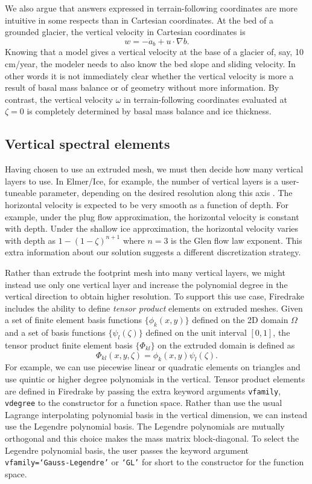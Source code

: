 \documentclass{article}
\theoremstyle{definition}
\theoremstyle{plain}
\begin{document}
We also argue that answers expressed in terrain-following coordinates are more intuitive in some respects than in Cartesian coordinates.
At the bed of a grounded glacier, the vertical velocity in Cartesian coordinates is
\begin{equation}
    w = -\dot a_b + u\cdot\nabla b.
\end{equation}
Knowing that a model gives a vertical velocity at the base of a glacier of, say, 10 cm/year, the modeler needs to also know the bed slope and sliding velocity.
In other words it is not immediately clear whether the vertical velocity is more a result of basal mass balance or of geometry without more information.
By contrast, the vertical velocity $\omega$ in terrain-following coordinates evaluated at $\zeta = 0$ is completely determined by basal mass balance and ice thickness.


\subsection{Vertical spectral elements}

Having chosen to use an extruded mesh, we must then decide how many vertical layers to use.
In Elmer/Ice, for example, the number of vertical layers is a user-tuneable parameter, depending on the desired resolution along this axis \citep{gagliardini2013capabilities}.
The horizontal velocity is expected to be very smooth as a function of depth.
For example, under the plug flow approximation, the horizontal velocity is constant with depth.
Under the shallow ice approximation, the horizontal velocity varies with depth as $1 - (1 - \zeta)^{n + 1}$ where $n = 3$ is the Glen flow law exponent.
This extra information about our solution suggests a different discretization strategy.

Rather than extrude the footprint mesh into many vertical layers, we might instead use only one vertical layer and increase the polynomial degree in the vertical direction to obtain higher resolution.
To support this use case, Firedrake includes the ability to define \emph{tensor product} elements on extruded meshes.
Given a set of finite element basis functions $\{\phi_k(x, y)\}$ defined on the 2D domain $\Omega$ and a set of basis functions $\{\psi_l(\zeta)\}$ defined on the unit interval $[0, 1]$, the tensor product finite element basis $\{\Phi_{kl}\}$ on the extruded domain is defined as
\begin{equation}
    \Phi_{kl}(x, y, \zeta) = \phi_k(x, y)\psi_l(\zeta).
\end{equation}
For example, we can use piecewise linear or quadratic elements on triangles and use quintic or higher degree polynomials in the vertical.
Tensor product elements are defined in Firedrake by passing the extra keyword arguments \texttt{vfamily}, \texttt{vdegree} to the constructor for a function space.
Rather than use the usual Lagrange interpolating polynomial basis in the vertical dimension, we can instead use the Legendre polynomial basis.
The Legendre polynomials are mutually orthogonal and this choice makes the mass matrix block-diagonal.
To select the Legendre polynomial basis, the user passes the keyword argument \texttt{vfamily=`Gauss-Legendre'} or \texttt{`GL'} for short to the constructor for the function space.
\end{document}
